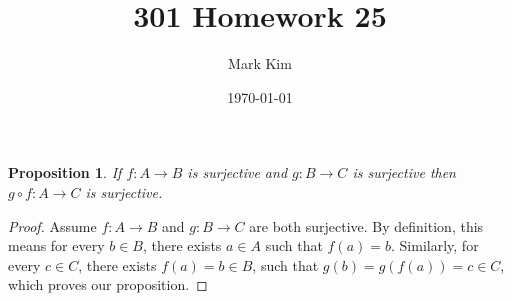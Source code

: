 \documentclass[12pt]{amsart}
\title{301 Homework 25}
\author{Mark Kim}
\date{\today}
\newtheorem*{proposition}{Proposition}
\begin{document}
\maketitle

\begin{proposition}
If $f\colon A\rightarrow B$ is surjective and $g\colon B\rightarrow C$ is surjective then $g\circ f\colon A\rightarrow C$ is surjective.
\end{proposition}

\begin{proof}
Assume $f\colon A\rightarrow B$ and $g\colon B\rightarrow C$ are both surjective. By definition, this means for every $b\in B$, there exists $a\in A$ such that $f(a)=b$. Similarly, for every $c\in C$, there exists $f(a)=b\in B$, such that $g(b)=g(f(a))=c\in C$, which proves our proposition.
\end{proof}
\end{document}
